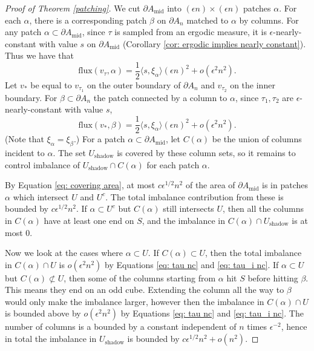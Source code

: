 \documentclass[11pt]{article}
\theoremstyle{remark}
\theoremstyle{definition}
\begin{document}
\begin{proof}[Proof of Theorem \ref{patching}]
    We cut $\partial A_{\text{mid}}$ into $(\epsilon n)\times (\epsilon n)$ patches $\alpha$. For each $\alpha$, there is a corresponding patch $\beta$ on $\partial A_n$ matched to $\alpha$ by columns. For any patch $\alpha\subset \partial A_{\text{mid}}$, since $\tau$ is sampled from an ergodic measure, it is $\epsilon$-nearly-constant with value $s$ on $\partial A_{\text{mid}}$ (Corollary \ref{cor: ergodic implies nearly constant}). Thus we have that 
\begin{equation}\label{eq: tau nc}
    \text{flux}(v_\tau,\alpha) = \frac{1}{2} \langle s, \xi_\alpha \rangle (\epsilon n)^2 + o(\epsilon^2 n^2).
\end{equation}
Let $v_\ast$ be equal to $v_{\tau_1}$ on the outer boundary of $\partial A_n$ and $v_{\tau_2}$ on the inner boundary. For $\beta\subset \partial A_n$ the patch connected by a column to $\alpha$, since $\tau_1,\tau_2$ are $\epsilon$-nearly-constant with value $s$, 
\begin{equation}\label{eq: tau_i nc}
    \text{flux}(v_{\ast},\beta) = \frac{1}{2} \langle s, \xi_\alpha \rangle (\epsilon n)^2 + o(\epsilon^2 n^2).
\end{equation}
(Note that $\xi_\alpha = \xi_\beta$.) For a patch $\alpha\subset \partial A_{\text{mid}}$, let $C(\alpha)$ be the union of columns incident to $\alpha$. The set $U_{\text{shadow}}$ is covered by these column sets, so it remains to control imbalance of $U_{\text{shadow}}\cap C(\alpha)$ for each patch $\alpha$.

By Equation \eqref{eq: covering area}, at most $c \epsilon^{1/2} n^2$ of the area of $\partial A_{\text{mid}}$ is in patches $\alpha$ which intersect $U$ and $U^c$. The total imbalance contribution from these is bounded by $c \epsilon^{1/2} n^2$. If $\alpha \subset U^c$ but $C(\alpha)$ still intersects $U$, then all the columns in $C(\alpha)$ have at least one end on $S$, and the imbalance in $C(\alpha)\cap U_{\text{shadow}}$ is at most $0$.

Now we look at the cases where $\alpha\subset U$. If $C(\alpha)\subset U$, then the total imbalance in $C(\alpha)\cap U$ is $o(\epsilon^2 n^2)$ by Equations \eqref{eq: tau nc} and \eqref{eq: tau_i nc}. If $\alpha\subset U$ but $C(\alpha)\not\subset U$, then some of the columns starting from $\alpha$ hit $S$ before hitting $\beta$. This means they end on an odd cube. Extending the column all the way to $\beta$ would only make the imbalance larger, however then the imbalance in $C(\alpha) \cap U$ is bounded above by $o(\epsilon^2 n^2)$ by Equations \eqref{eq: tau nc} and \eqref{eq: tau_i nc}. The number of columns is a bounded by a constant independent of $n$ times $\epsilon^{-2}$, hence in total the imbalance in $U_{\text{shadow}}$ is bounded by $c \epsilon^{1/2} n^2 + o(n^2)$.


\end{proof}
\end{document}
